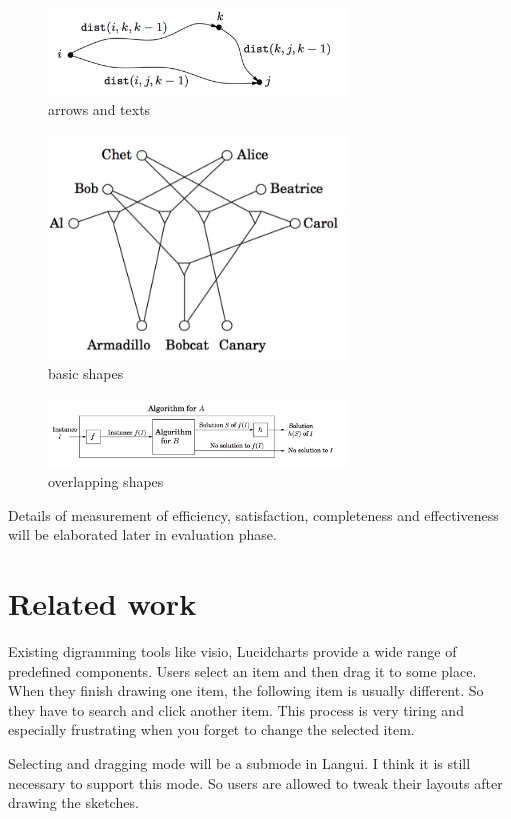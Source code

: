 \documentclass[10pt,conference, twocolumn]{IEEEtran}
\begin{document}
\begin{figure}[H]
\caption{arrows and texts}
\includegraphics[width=8cm]{2.png}
\end{figure}

\begin{figure}[H]
\caption{basic shapes}
\includegraphics[width=8cm]{3.png}
\end{figure}

\begin{figure}[H]
\caption{overlapping shapes}
\includegraphics[width=8cm]{4.png}
\end{figure}

Details of measurement of efficiency, satisfaction, completeness and effectiveness will be elaborated later in evaluation phase.

\section{Related work}
Existing digramming tools like visio, Lucidcharts provide a wide range of predefined components. Users select an item and then drag it to some place. When they finish drawing one item, the following item is usually different. So they have to search and click another item. This process is very tiring and especially frustrating when you forget to change the selected item.

Selecting and dragging mode will be a submode in Langui. I think it is still necessary to support this mode. So users are allowed to tweak their layouts after drawing the sketches.
\end{document}
